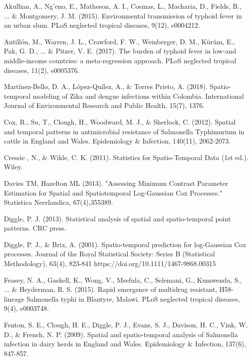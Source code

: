 \documentclass[12pt,a4paper]{report}
\begin{document}
\begin{thebibliography}{99}
	
	 Akullian, A., Ng’eno, E., Matheson, A. I., Cosmas, L., Macharia, D., Fields, B., ... \& Montgomery, J. M. (2015). Environmental transmission of typhoid fever in an urban slum. PLoS neglected tropical diseases, 9(12), e0004212.
	
	 Antillón, M., Warren, J. L., Crawford, F. W., Weinberger, D. M., Kürüm, E., Pak, G. D., ... \& Pitzer, V. E. (2017). The burden of typhoid fever in low-and middle-income countries: a meta-regression approach. PLoS neglected tropical diseases, 11(2), e0005376.
	
	 Martínez-Bello, D. A., López-Quílez, A., \& Torres Prieto, A. (2018). Spatio-temporal modeling of Zika and dengue infections within Colombia. International Journal of Environmental Research and Public Health, 15(7), 1376.
	
	 Cox, R., Su, T., Clough, H., Woodward, M. J., \& Sherlock, C. (2012). Spatial and temporal patterns in antimicrobial resistance of Salmonella Typhimurium in cattle in England and Wales. Epidemiology \& Infection, 140(11), 2062-2073.
	
	 Cressie , N., \& Wikle, C. K. (2011). Statistics for Spatio-Temporal Data (1st ed.). Wiley.
	
	 Davies TM, Hazelton ML (2013). "Assessing Minimum Contrast Parameter Estimation for
	Spatial and Spatiotemporal Log-Gaussian Cox Processes." Statistica Neerlandica, 67(4),355{389}.
	
	 Diggle, P. J. (2013). Statistical analysis of spatial and spatio-temporal point patterns. CRC press.
	
	 Diggle, P. J., \& Brix, A. (2001). Spatio-temporal prediction for log-Gaussian Cox processes. Journal of the Royal Statistical Society: Series B (Statistical Methodology), 63(4), 823-841 https://doi.org/10.1111/1467-9868.00315
	
	Feasey, N. A., Gaskell, K., Wong, V., Msefula, C., Selemani, G., Kumwenda, S., ... \& Heyderman, R. S. (2015). Rapid emergence of multidrug resistant, H58-lineage Salmonella typhi in Blantyre, Malawi. PLoS neglected tropical diseases, 9(4), e0003748.
	
	 Fenton, S. E., Clough, H. E., Diggle, P. J., Evans, S. J., Davison, H. C., Vink, W. D., \& French, N. P. (2009). Spatial and spatio-temporal analysis of Salmonella infection in dairy herds in England and Wales. Epidemiology \& Infection, 137(6), 847-857.
	

\end{thebibliography}
\end{document}
